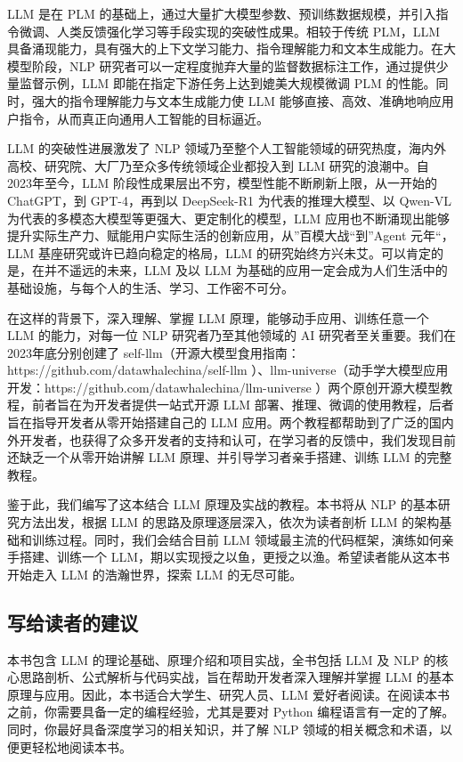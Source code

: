 \documentclass[12pt,a4paper]{book}
\begin{document}
LLM 是在 PLM
的基础上，通过大量扩大模型参数、预训练数据规模，并引入指令微调、人类反馈强化学习等手段实现的突破性成果。相较于传统
PLM，LLM
具备涌现能力，具有强大的上下文学习能力、指令理解能力和文本生成能力。在大模型阶段，NLP
研究者可以一定程度抛弃大量的监督数据标注工作，通过提供少量监督示例，LLM
即能在指定下游任务上达到媲美大规模微调 PLM
的性能。同时，强大的指令理解能力与文本生成能力使 LLM
能够直接、高效、准确地响应用户指令，从而真正向通用人工智能的目标逼近。

LLM 的突破性进展激发了 NLP
领域乃至整个人工智能领域的研究热度，海内外高校、研究院、大厂乃至众多传统领域企业都投入到
LLM 研究的浪潮中。自 2023年至今，LLM
阶段性成果层出不穷，模型性能不断刷新上限，从一开始的 ChatGPT，到
GPT-4，再到以 DeepSeek-R1 为代表的推理大模型、以 Qwen-VL
为代表的多模态大模型等更强大、更定制化的模型，LLM
应用也不断涌现出能够提升实际生产力、赋能用户实际生活的创新应用，从''百模大战``到''Agent
元年``，LLM 基座研究或许已趋向稳定的格局，LLM
的研究始终方兴未艾。可以肯定的是，在并不遥远的未来，LLM 及以 LLM
为基础的应用一定会成为人们生活中的基础设施，与每个人的生活、学习、工作密不可分。

在这样的背景下，深入理解、掌握 LLM 原理，能够动手应用、训练任意一个 LLM
的能力，对每一位 NLP 研究者乃至其他领域的 AI 研究者至关重要。我们在
2023年底分别创建了
self-llm（开源大模型食用指南：https://github.com/datawhalechina/self-llm
）、llm-universe（动手学大模型应用开发：https://github.com/datawhalechina/llm-universe
）两个原创开源大模型教程，前者旨在为开发者提供一站式开源 LLM
部署、推理、微调的使用教程，后者旨在指导开发者从零开始搭建自己的 LLM
应用。两个教程都帮助到了广泛的国内外开发者，也获得了众多开发者的支持和认可，在学习者的反馈中，我们发现目前还缺乏一个从零开始讲解
LLM 原理、并引导学习者亲手搭建、训练 LLM 的完整教程。

鉴于此，我们编写了这本结合 LLM 原理及实战的教程。本书将从 NLP
的基本研究方法出发，根据 LLM 的思路及原理逐层深入，依次为读者剖析 LLM
的架构基础和训练过程。同时，我们会结合目前 LLM
领域最主流的代码框架，演练如何亲手搭建、训练一个
LLM，期以实现授之以鱼，更授之以渔。希望读者能从这本书开始走入 LLM
的浩瀚世界，探索 LLM 的无尽可能。

\subsection{写给读者的建议}\label{ux5199ux7ed9ux8bfbux8005ux7684ux5efaux8bae}

本书包含 LLM 的理论基础、原理介绍和项目实战，全书包括 LLM 及 NLP
的核心思路剖析、公式解析与代码实战，旨在帮助开发者深入理解并掌握 LLM
的基本原理与应用。因此，本书适合大学生、研究人员、LLM
爱好者阅读。在阅读本书之前，你需要具备一定的编程经验，尤其是要对 Python
编程语言有一定的了解。同时，你最好具备深度学习的相关知识，并了解 NLP
领域的相关概念和术语，以便更轻松地阅读本书。
\end{document}

